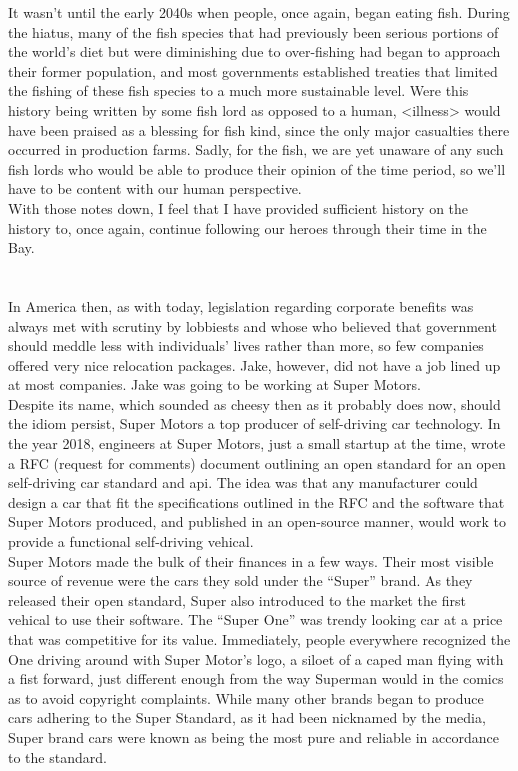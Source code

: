 \documentclass[12pt,openany]{memoir}
\begin{document}
It wasn't until the early 2040s when people, once again, began eating fish.
During the hiatus, many of the fish species that had previously been serious portions of the world's diet but were diminishing due to over-fishing had began to approach their former population, and most governments established treaties that limited the fishing of these fish species to a much more sustainable level.
Were this history being written by some fish lord as opposed to a human, <illness> would have been praised as a blessing for fish kind, since the only major casualties there occurred in production farms.
Sadly, for the fish, we are yet unaware of any such fish lords who would be able to produce their opinion of the time period, so we'll have to be content with our human perspective.
\\

With those notes down, I feel that I have provided sufficient history on the history to, once again, continue following our heroes through their time in the Bay.
\\

\chapter{}

In America then, as with today, legislation regarding corporate benefits was always met with scrutiny by lobbiests and whose who believed that government should meddle less with individuals' lives rather than more, so few companies offered very nice relocation packages.
Jake, however, did not have a job lined up at most companies.
Jake was going to be working at Super Motors.
\\

Despite its name, which sounded as cheesy then as it probably does now, should the idiom persist, Super Motors a top producer of self-driving car technology.
In the year 2018, engineers at Super Motors, just a small startup at the time, wrote a RFC (request for comments) document outlining an open standard for an open self-driving car standard and api.
The idea was that any manufacturer could design a car that fit the specifications outlined in the RFC and the software that Super Motors produced, and published in an open-source manner, would work to provide a functional self-driving vehical.
\\

Super Motors made the bulk of their finances in a few ways.
Their most visible source of revenue were the cars they sold under the ``Super'' brand.
As they released their open standard, Super also introduced to the market the first vehical to use their software.
The ``Super One'' was trendy looking car at a price that was competitive for its value.
Immediately, people everywhere recognized the One driving around with Super Motor's logo, a siloet of a caped man flying with a fist forward, just different enough from the way Superman would in the comics as to avoid copyright complaints.
While many other brands began to produce cars adhering to the Super Standard, as it had been nicknamed by the media, Super brand cars were known as being the most pure and reliable in accordance to the standard.
\\
\end{document}
